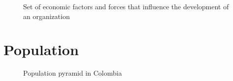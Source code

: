 \documentclass[
  ignorenonframetext,
]{beamer}
\begin{document}
\begin{frame}{}
\label{section-2}
\begin{figure}


\caption{\label{fig-econ-env-macro}Set of economic factors and forces
that influence the development of an organization}

\end{figure}%
\end{frame}

\section{Population}\label{population}

\begin{frame}{}
\label{section-3}
\begin{figure}


\caption{\label{fig-population-col}Population pyramid in Colombia}

\end{figure}%
\end{frame}
\end{document}
